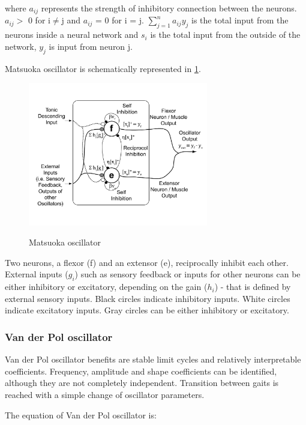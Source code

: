 \documentclass[12pt,a4paper]{report}
\begin{document}
				where $a_{ij}$ represents the strength of inhibitory connection between the neurons. $a_{ij} >$ 0 for i$\neq$j and $a_{ij}$ = 0 for i = j. $\sum^n_{j = 1} a_{ij} y_j $ is the total input from the neurons inside a neural network and $s_{i}$ is the total input from the outside of the network, $y_j$ is input from neuron j. 
				
				Matsuoka oscillator is schematically represented in \cref{fig:4}.
				\begin{figure}[H]
					\vspace{-0.2cm}
					\centering
					{\includegraphics[width=0.7\textwidth]{4}}
					\caption{Matsuoka oscillator \cite{liu2008central}}
					\label{fig:4}
					\vspace{-0.1cm}
				\end{figure}
				
				Two neurons, a flexor (f) and an extensor (e), reciprocally inhibit each other. External inputs ($g_i$) such as sensory feedback or inputs for other neurons can be either inhibitory or excitatory, depending on the gain ($h_i$) - that is defined by external sensory inputs. Black circles indicate inhibitory inputs. White circles indicate excitatory inputs. Gray circles can be either inhibitory or excitatory.
			\subsubsection{Van der Pol oscillator}
				Van der Pol oscillator benefits are stable limit cycles and relatively interpretable coefficients. Frequency, amplitude and shape coefficients can be identified, although they are not completely independent. Transition between gaits is reached with a simple change of oscillator parameters.
				
				The equation of Van der Pol oscillator is:
				
\end{document}
